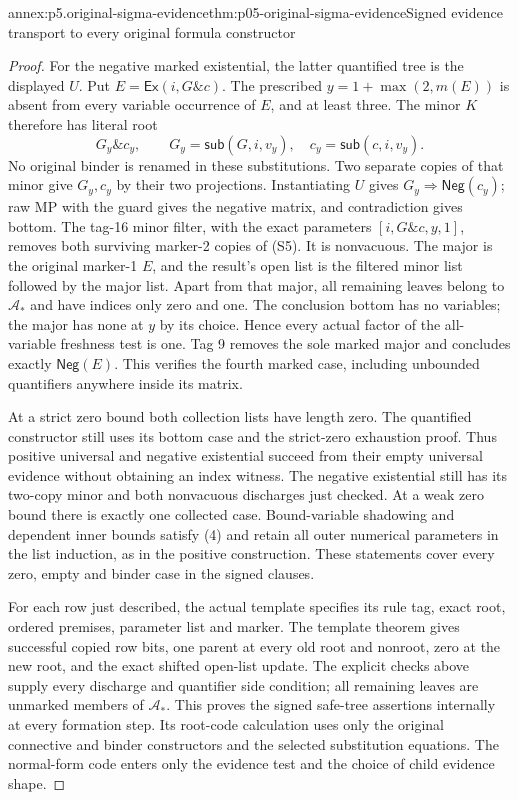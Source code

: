 \begin{annexitem}{annex:p5.original-sigma-evidence}{thm:p05-original-sigma-evidence}{Signed evidence transport to every original formula constructor}
\begin{proof}
For the negative marked existential, the latter quantified tree
is the displayed \(U\). Put \(E=\mathsf{Ex}(i,G\mathbin{\&}c)\).
The prescribed \(y=1+\max(2,m(E))\) is absent from every
variable occurrence of \(E\), and at least three. The minor
\(K\) therefore has literal root
\[
 G_y\mathbin{\&}c_y,\qquad
 G_y=\mathsf{sub}(G,i,v_y),\quad c_y=\mathsf{sub}(c,i,v_y).
\tag{S5}
\]
No original binder is renamed in these substitutions. Two
separate copies of that minor give \(G_y,c_y\) by their two
projections. Instantiating \(U\) gives
\(G_y\Rightarrow\mathsf{Neg}(c_y)\); raw MP with the guard
gives the negative matrix, and contradiction gives bottom.
The tag-16 minor filter, with the exact parameters
\([i,G\mathbin{\&}c,y,1]\), removes both surviving marker-2
copies of (S5). It is nonvacuous. The major is the original
marker-1 \(E\), and the result's open list is the filtered
minor list followed by the major list. Apart from that major,
all remaining leaves belong to \(\mathcal A_*\) and have
indices only zero and one. The conclusion bottom has no variables;
the major has none at \(y\) by its choice. Hence every actual
factor of the all-variable freshness test is one. Tag 9 removes
the sole marked major and concludes exactly
\(\mathsf{Neg}(E)\). This verifies the fourth marked case,
including unbounded quantifiers anywhere inside its matrix.

At a strict zero bound both collection lists have length zero.
The quantified constructor still uses its bottom case and the
strict-zero exhaustion proof. Thus positive universal and
negative existential succeed from their empty universal evidence
without obtaining an index witness. The negative existential
still has its two-copy minor and both nonvacuous discharges just
checked. At a weak zero bound there is exactly one collected
case. Bound-variable shadowing and dependent inner bounds satisfy
(4) and retain all outer numerical parameters in the list
induction, as in the positive construction. These statements
cover every zero, empty and binder case in the signed clauses.

For each row just described, the actual template specifies its
rule tag, exact root, ordered premises, parameter list and marker.
The template theorem gives successful copied row bits, one
parent at every old root and nonroot, zero at the new root,
and the exact shifted open-list update. The explicit checks
above supply every discharge and quantifier side condition;
all remaining leaves are unmarked members of \(\mathcal A_*\).
This proves the signed safe-tree assertions internally at every
formation step. Its root-code calculation uses only the original
connective and binder constructors and the selected substitution
equations. The normal-form code enters only the evidence test
and the choice of child evidence shape.


\end{proof}
\end{annexitem}
